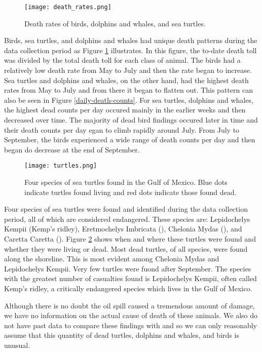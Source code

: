 \documentclass[11pt]{article}
\begin{document}
\begin{figure}[htbp] %
   \centering
   \texttt{[image: death\_rates.png]} 
   \caption{Death rates of birds, dolphins and whales, and sea turtles. }
   \label{death rates}
\end{figure}

Birds, sea turtles, and dolphins and whales had unique death patterns during the data collection period as Figure \ref{death rates}  illustrates. In this figure, the to-date death toll was divided by the total death toll for each class of animal. The birds had a relatively low death rate from May to July and then the rate began to increase. Sea turtles and dolphins and whales, on the other hand, had the highest death rates from May to July and from there it began to flatten out. This pattern can also be seen in Figure \ref{daily-death-counts}. For sea turtles, dolphins and whales, the highest dead counts per day occured mainly in the earlier weeks and then decreased over time.  The majority of dead bird findings occured later in time and their death counts per day egan to climb rapidly around July. From July to September, the birds experienced a wide range of death counts per day and then began do decrease at the end of September.   

\begin{figure}[htbp] %
   \centering
   \texttt{[image: turtles.png]} 
   \caption{Four species of sea turtles found in the Gulf of Mexico.  Blue dots indicate turtles found living and red dots indicate those found dead.}
   \label{turtles}
\end{figure}

Four species of sea turtles were found and identified during the data collection period, all of which are considered endangered.  These species are: Lepidochelys Kempii (Kemp's ridley), Eretmochelys Imbricata (), Chelonia Mydas (), and Caretta Caretta (). Figure \ref{turtles} shows when and where these turtles were found and whether they were living or dead. Most dead turtles, of all species, were found along the shoreline. This is most evident among Chelonia Mydas and Lepidochelys Kempii.  Very few turtles were fuond after September. The species with the greatest number of casualties found is Lepidochelys Kempii, often called Kemp's ridley, a critically endangered species which lives in the Gulf of Mexico. 

Although there is no doubt the oil spill caused a tremendous amount of damage, we have no information on the actual cause of death of these animals.  We also do not have past data to compare these findings with and so we can only reasonably assume that this quantity of dead turtles, dolphins and whales, and birds is unusual.  
\end{document}
